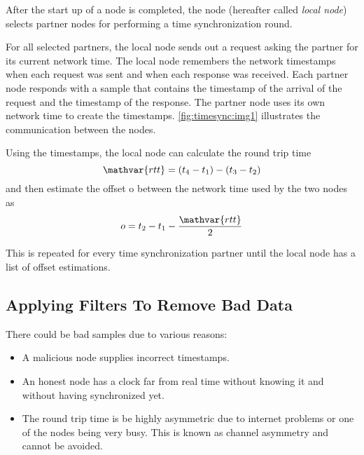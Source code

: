After the start up of a node is completed, the node (hereafter called \emph{local node}) selects partner nodes for performing a time synchronization round.

For all selected partners, the local node sends out a request asking the partner for its current network time.
The local node remembers the network timestamps when each request was sent and when each response was received.
Each partner node responds with a sample that contains the timestamp of the arrival of the request and the timestamp of the response.
The partner node uses its own network time to create the timestamps.
\autoref{fig:timesync:img1} illustrates the communication between the nodes.

\begin{figure}
\end{figure}

Using the timestamps, the local node can calculate the round trip time
$$\mathvar{rtt} = (t_4 - t_1) - (t_3 - t_2)$$
and then estimate the offset o between the network time used by the two nodes as
$$o = t_2 - t_1 - \frac{\mathvar{rtt}}{2}$$

This is repeated for every time synchronization partner until the local node has a list of offset estimations.

\subsection{Applying Filters To Remove Bad Data}

There could be bad samples due to various reasons:
\begin{itemize}
\item A malicious node supplies incorrect timestamps.
\item An honest node has a clock far from real time without knowing it and without having synchronized yet.
\item The round trip time is be highly asymmetric due to internet problems or one of the nodes being very busy.
This is known as channel asymmetry and cannot be avoided.
\end{itemize}


